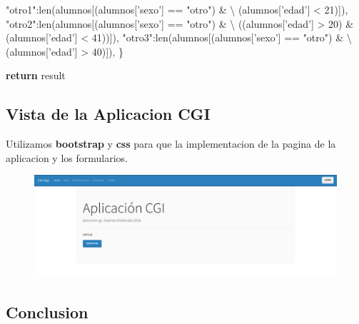 \documentclass[12pt]{extarticle}
\newenvironment{Shaded}{}{}
\newcommand{\DecValTok}[1]{\textcolor[rgb]{0.25,0.63,0.44}{{#1}}}
\newcommand{\StringTok}[1]{\textcolor[rgb]{0.25,0.44,0.63}{{#1}}}
\newcommand{\NormalTok}[1]{{#1}}
\newcommand{\ControlFlowTok}[1]{\textcolor[rgb]{0.00,0.44,0.13}{\textbf{{#1}}}}
\newcommand{\OperatorTok}[1]{\textcolor[rgb]{0.40,0.40,0.40}{{#1}}}
\newcommand{\BuiltInTok}[1]{{#1}}
\begin{document}
\begin{Shaded}
\begin{Highlighting}[]
        \StringTok{"otro1"}\NormalTok{:}\BuiltInTok{len}\NormalTok{(alumnos[(alumnos[}\StringTok{'sexo'}\NormalTok{] }\OperatorTok{==} \StringTok{"otro"}\NormalTok{) }\OperatorTok{&} \OperatorTok{\textbackslash{}}
\NormalTok{                            (alumnos[}\StringTok{'edad'}\NormalTok{] }\OperatorTok{<} \DecValTok{21}\NormalTok{)]),}
        \StringTok{"otro2"}\NormalTok{:}\BuiltInTok{len}\NormalTok{(alumnos[(alumnos[}\StringTok{'sexo'}\NormalTok{] }\OperatorTok{==} \StringTok{"otro"}\NormalTok{) }\OperatorTok{&} \OperatorTok{\textbackslash{}}
\NormalTok{                            ((alumnos[}\StringTok{'edad'}\NormalTok{] }\OperatorTok{>} \DecValTok{20}\NormalTok{) }\OperatorTok{&}\NormalTok{ (alumnos[}\StringTok{'edad'}\NormalTok{] }\OperatorTok{<} \DecValTok{41}\NormalTok{))]),}
        \StringTok{"otro3"}\NormalTok{:}\BuiltInTok{len}\NormalTok{(alumnos[(alumnos[}\StringTok{'sexo'}\NormalTok{] }\OperatorTok{==} \StringTok{"otro"}\NormalTok{) }\OperatorTok{&} \OperatorTok{\textbackslash{}}
\NormalTok{                            (alumnos[}\StringTok{'edad'}\NormalTok{] }\OperatorTok{>} \DecValTok{40}\NormalTok{)]),}
\NormalTok{    \}}

    \ControlFlowTok{return}\NormalTok{ result}
\end{Highlighting}
\end{Shaded}

\subsection{Vista de la Aplicacion
CGI}\label{vista-de-la-aplicacion-cgi}

Utilizamos \textbf{bootstrap} y \textbf{css} para que la implementacion
de la pagina de la aplicacion y los formularios.

\begin{figure}
\centering
\includegraphics{images/interfaz-cgi.png}
\caption{}
\end{figure}

\subsection{Conclusion}\label{conclusion}
\end{document}
